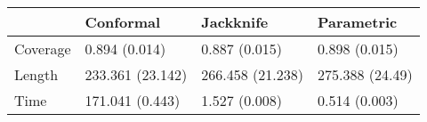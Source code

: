 \begin{tabular}{|l|l|l|l|}
\hline
& Conformal & Jackknife & Parametric \\
\hline
Coverage & 0.894 (0.014) & 0.887 (0.015) & 0.898 (0.015) \\
\hline
Length & 233.361 (23.142) & 266.458 (21.238) & 275.388 (24.49) \\
\hline
Time & 171.041 (0.443) & 1.527 (0.008) & 0.514 (0.003) \\
\hline
\end{tabular}
